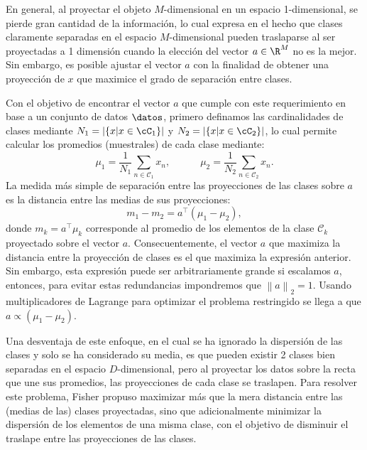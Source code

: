 En general, al proyectar el objeto $M$-dimensional en un espacio  1-dimensional, se pierde gran cantidad de la información, lo cual expresa en el hecho que clases claramente separadas en el espacio $M$-dimensional pueden traslaparse al ser proyectadas a 1 dimensión cuando la elección del vector $a\in\R^M$ no es la mejor. Sin embargo, es posible ajustar el vector $a$ con la finalidad de obtener una proyección de $x$ que maximice el grado de separación entre clases.

Con el objetivo de encontrar el vector $a$ que cumple con este requerimiento en base a un conjunto de datos  $\datos$, primero definamos las cardinalidades de clases mediante $N_1 = |\{x|x\in\cC_1\}|$ y $N_2 = |\{x|x\in\cC_2\}|$, lo cual permite calcular los promedios (muestrales) de cada  clase mediante: 
\begin{equation}
	\mu_1=\frac{1}{N_1}\sum_{n\in\mathcal{C}_1}x_n,
	\quad\quad\quad
	\mu_2=\frac{1}{N_2}\sum_{n\in\mathcal{C}_2}x_n.
\end{equation}
La medida más simple de separación entre las proyecciones de las clases sobre $a$ es la distancia entre las medias  de sus proyecciones:
\begin{equation}
	m_1 - m_2 = a^\top(\mu_1-\mu_2),
\end{equation}
donde $m_k= a^\top\mu_k$ corresponde al promedio de los elementos de  la clase $\mathcal{C}_k$ proyectado sobre el  vector $a$. Consecuentemente, el vector $a$ que maximiza la distancia entre la proyección de clases es el que maximiza la expresión anterior. Sin embargo, esta expresión puede ser arbitrariamente grande si escalamos $a$, entonces, para evitar estas redundancias impondremos que $\left \| a \right \|_2=1$. Usando multiplicadores de Lagrange para optimizar el problema restringido se llega a que $a\propto(\mu_1-\mu_2)$. 

Una desventaja de este enfoque, en el cual se ha ignorado la dispersión de las clases y solo se ha considerado su media, es que pueden existir 2 clases bien separadas en el espacio $D$-dimensional, pero al proyectar los datos sobre la recta que une sus promedios, las proyecciones de cada clase se traslapen. Para resolver este problema, Fisher propuso maximizar más que la mera distancia entre las (medias de las) clases proyectadas, sino que adicionalmente minimizar la dispersión de los elementos de una misma clase, con el objetivo de disminuir el traslape entre las proyecciones de las clases. 

